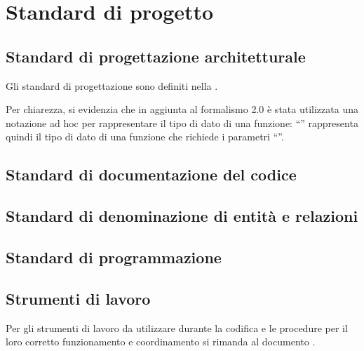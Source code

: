 \section{Standard di progetto}

\subsection{Standard di progettazione architetturale}
Gli standard di progettazione sono definiti nella \SpecificaTecnica{}.

Per chiarezza, si evidenzia che in aggiunta al formalismo  2.0 è stata utilizzata una notazione ad hoc per rappresentare il tipo di dato di una funzione: ``'' rappresenta quindi il tipo di dato di una funzione che richiede i parametri ``''.

\subsection{Standard di documentazione del codice}

\subsection{Standard di denominazione di entità e relazioni}

\subsection{Standard di programmazione}

\subsection{Strumenti di lavoro}
	Per gli strumenti di lavoro da utilizzare durante la codifica e le procedure per il loro corretto funzionamento e coordinamento si rimanda al documento \NormeDiProgetto{}.